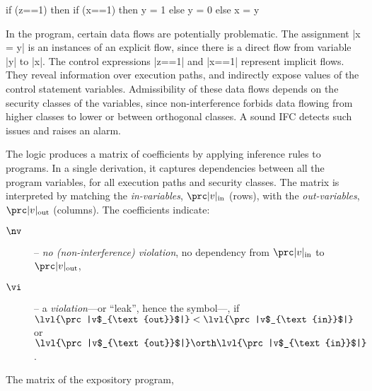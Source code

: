 \noindent\begin{center}
\begin{minipage}{\textwidth}
\begin{cstarlisting}
if (z==1)
then if (x==1) then y = 1 else y = 0
else x = y
\end{cstarlisting}
\end{minipage}\end{center}
In the program, certain data flows are potentially problematic.
The assignment \prc|x = y| is an instances of an explicit flow, since there is a direct flow from variable \prc|y| to \prc|x|.
The control expressions \prc|z==1| and \prc|x==1| represent implicit flows.
They reveal information over execution paths, and indirectly expose values of the control statement variables.
Admissibility of these data flows depends on the security classes of the variables, since non-interference forbids data flowing from higher classes to lower or between orthogonal classes.
A sound IFC detects such issues and raises an alarm.

The logic \lname produces a matrix of coefficients by applying inference rules to programs.
In a single derivation, it captures dependencies between all the program variables, for all execution paths and security classes.
The matrix is interpreted by matching the \emph{in-variables}, \(\prc|v|_{\text{in}}\) (rows), with the \emph{out-variables},
\(\prc|v|_{\text{out}}\) (columns).
The coefficients indicate:
\begin{description}
\item[\(\nv\)] -- \emph{no \emph{(non-interference)} violation}, no dependency from $\prc|v|_{\text{in}}$ to $\prc|v|_{\text{out}}$,
\item[\(\vi\)]  -- a \emph{violation}---or \enquote{leak}, hence the symbol---, if \(\lvl{\prc|v$_{\text{out}}$|} < \lvl{\prc|v$_{\text{in}}$|}\) or \(\lvl{\prc|v$_{\text{out}}$|} \orth \lvl{\prc|v$_{\text{in}}$|}\).
\end{description}

The matrix of the expository program,

